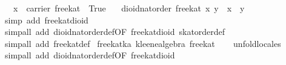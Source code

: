 \begin{isabellebody}
\ \ \ {}x\ {}\ carrier\ free{}kat\ {}\ True{}\isanewline
\ \ \ {}dioid{}nat{}order\ free{}kat\ x\ y\ {}\ {}x\ {}\ y{}{}\isanewline
%
\isadelimproof
\ \ %
\endisadelimproof
%
\isatagproof
{}\isamarkupfalse%
\ {}simp\ add{}\ free{}kat{}dioid{}\isanewline
\ \ \isamarkupfalse%
\ {}simp{}all\ add{}\ dioid{}nat{}order{}def{}OF\ free{}kat{}dioid{}\ skat{}order{}def{}\isanewline
\ \ \isamarkupfalse%
\ {}simp{}all\ add{}\ free{}kat{}def{}%
\endisatagproof
{\isafoldproof}%
%
\isadelimproof
\isanewline
%
\endisadelimproof
\isanewline
{}\isamarkupfalse%
\ free{}kat{}ka{}\ {}kleene{}algebra\ free{}kat{}\isanewline
%
\isadelimproof
\ \ %
\endisadelimproof
%
\isatagproof
{}\isamarkupfalse%
\ unfold{}locales\isanewline
\ \ \isamarkupfalse%
\ {}simp{}all\ add{}\ dioid{}nat{}order{}def{}OF\ free{}kat{}dioid{}{}\isanewline

\end{isabellebody}
